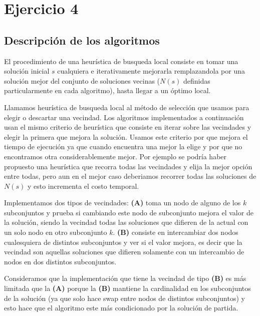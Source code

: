 \section{Ejercicio 4}
\subsection{Descripción de los algoritmos}
El procedimiento de una heurística de busqueda local consiste en tomar una solución inicial $s$ cualquiera e iterativamente mejorarla remplazandola por una solución mejor del conjunto de soluciones vecinas ($N(s)$ definidas particularmente en cada algoritmo), hasta llegar a un óptimo local.

Llamamos heurística de busqueda local al método de selección que usamos para elegir o descartar una vecindad. Los algoritmos implementados a continuación usan el mismo criterio de heurística que consiste en iterar sobre las vecindades y elegir la primera que mejora la solución. Usamos este criterio por que mejora el tiempo de ejecución ya que cuando encuentra una mejor la elige y por que no encontramos otra considerablemente mejor. Por ejemplo se podría haber propuesto una heurística que recorra todas las vecindades y elija la mejor opción entre todas, pero aun en el mejor caso deberiamos recorrer todas las soluciones de $N(s)$ y esto incrementa el costo temporal.

Implementamos dos tipos de vecindades: \textbf{(A)} toma un nodo de alguno de los $k$ subconjuntos y prueba si cambiando este nodo de subconjunto mejora el valor de la solución, siendo la vecindad todas las soluciones que difieren de la actual con un solo nodo en otro subconjunto $k$. \textbf{(B)} consiste en intercambiar dos nodos cualesquiera de distintos subconjuntos y ver si el valor mejora, es decir que la vecindad son aquellas soluciones que difieren solamente con un intercambio de nodos en dos distintos subconjuntos.

Consideramos que la implementación que tiene la vecindad de tipo \textbf{(B)} es más limitada que la \textbf{(A)} porque la \textbf{(B)} mantiene la cardinalidad en los subconjuntos de la solución (ya que solo hace swap entre nodos de distintos subconjuntos) y esto hace que el algoritmo este más condicionado por la solución de partida.

